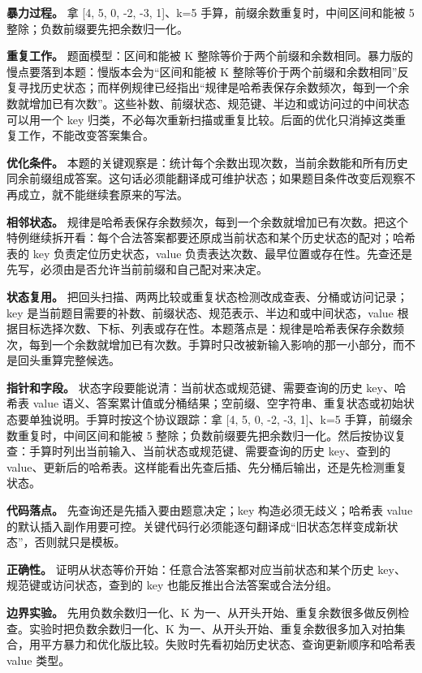 \textbf{暴力过程。} 拿 [4, 5, 0, -2, -3, 1]、k=5 手算，前缀余数重复时，中间区间和能被 5 整除；负数前缀要先把余数归一化。

\textbf{重复工作。} 题面模型：区间和能被 K 整除等价于两个前缀和余数相同。暴力版的慢点要落到本题：慢版本会为“区间和能被 K 整除等价于两个前缀和余数相同”反复寻找历史状态；而样例规律已经指出“规律是哈希表保存余数频次，每到一个余数就增加已有次数”。这些补数、前缀状态、规范键、半边和或访问过的中间状态可以用一个 key 归类，不必每次重新扫描或重复比较。后面的优化只消掉这类重复工作，不能改变答案集合。

\textbf{优化条件。} 本题的关键观察是：统计每个余数出现次数，当前余数能和所有历史同余前缀组成答案。这句话必须能翻译成可维护状态；如果题目条件改变后观察不再成立，就不能继续套原来的写法。

\textbf{相邻状态。} 规律是哈希表保存余数频次，每到一个余数就增加已有次数。把这个特例继续拆开看：每个合法答案都要还原成当前状态和某个历史状态的配对；哈希表的 key 负责定位历史状态，value 负责表达次数、最早位置或存在性。先查还是先写，必须由是否允许当前前缀和自己配对来决定。

\textbf{状态复用。} 把回头扫描、两两比较或重复状态检测改成查表、分桶或访问记录；key 是当前题目需要的补数、前缀状态、规范表示、半边和或中间状态，value 根据目标选择次数、下标、列表或存在性。本题落点是：规律是哈希表保存余数频次，每到一个余数就增加已有次数。手算时只改被新输入影响的那一小部分，而不是回头重算完整候选。

\textbf{指针和字段。} 状态字段要能说清：当前状态或规范键、需要查询的历史 key、哈希表 value 语义、答案累计值或分桶结果；空前缀、空字符串、重复状态或初始状态要单独说明。手算时按这个协议跟踪：拿 [4, 5, 0, -2, -3, 1]、k=5 手算，前缀余数重复时，中间区间和能被 5 整除；负数前缀要先把余数归一化。然后按协议复查：手算时列出当前输入、当前状态或规范键、需要查询的历史 key、查到的 value、更新后的哈希表。这样能看出先查后插、先分桶后输出，还是先检测重复状态。

\textbf{代码落点。} 先查询还是先插入要由题意决定；key 构造必须无歧义；哈希表 value 的默认插入副作用要可控。关键代码行必须能逐句翻译成“旧状态怎样变成新状态”，否则就只是模板。

\textbf{正确性。} 证明从状态等价开始：任意合法答案都对应当前状态和某个历史 key、规范键或访问状态，查到的 key 也能反推出合法答案或合法分组。

\textbf{边界实验。} 先用负数余数归一化、K 为一、从开头开始、重复余数很多做反例检查。实验时把负数余数归一化、K 为一、从开头开始、重复余数很多加入对拍集合，用平方暴力和优化版比较。失败时先看初始历史状态、查询更新顺序和哈希表 value 类型。

